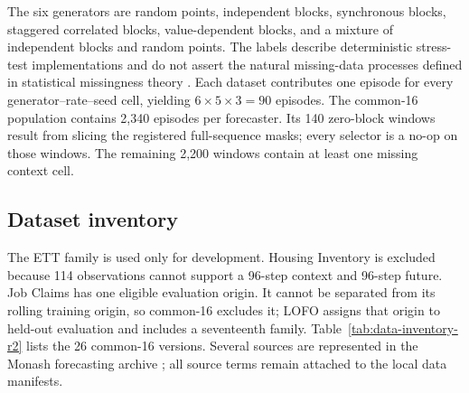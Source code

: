 The six generators are random points, independent blocks, synchronous blocks, staggered correlated blocks, value-dependent blocks, and a mixture of independent blocks and random points. The labels describe deterministic stress-test implementations and do not assert the natural missing-data processes defined in statistical missingness theory \citep{rubin1976inference}. Each dataset contributes one episode for every generator--rate--seed cell, yielding $6\times5\times3=90$ episodes. The common-16 population contains 2,340 episodes per forecaster. Its 140 zero-block windows result from slicing the registered full-sequence masks; every selector is a no-op on those windows. The remaining 2,200 windows contain at least one missing context cell.

\subsection{Dataset inventory}

The ETT family \citep{zhou2021informer} is used only for development. Housing Inventory is excluded because 114 observations cannot support a 96-step context and 96-step future. Job Claims has one eligible evaluation origin. It cannot be separated from its rolling training origin, so common-16 excludes it; LOFO assigns that origin to held-out evaluation and includes a seventeenth family. Table~\ref{tab:data-inventory-r2} lists the 26 common-16 versions. Several sources are represented in the Monash forecasting archive \citep{godahewa2021monash}; all source terms remain attached to the local data manifests.

